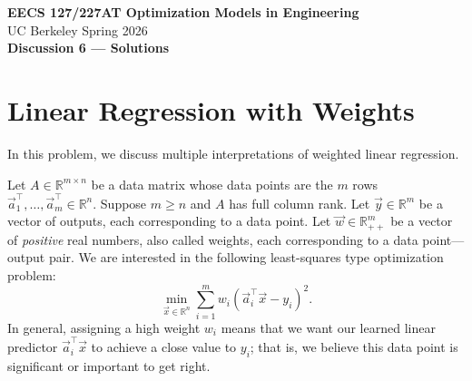 \documentclass[10pt]{article}
\newcommand{\RR}{\mathbb{R}}
\begin{document}
\begin{center}
    {\Large\bfseries EECS 127/227AT \quad Optimization Models in Engineering}\\[0.5em]
    {\large UC Berkeley \hfill Spring 2026}\\[1em]
    {\LARGE\bfseries Discussion 6 --- Solutions}
\end{center}

\section{Linear Regression with Weights}

In this problem, we discuss multiple interpretations of weighted linear regression.

Let $A \in \RR^{m \times n}$ be a data matrix whose data points are the $m$ rows $\vec{a}_1^\top, \ldots, \vec{a}_m^\top \in \RR^n$. Suppose $m \geq n$ and $A$ has full column rank. Let $\vec{y} \in \RR^m$ be a vector of outputs, each corresponding to a data point. Let $\vec{w} \in \RR^m_{++}$ be a vector of \emph{positive} real numbers, also called weights, each corresponding to a data point---output pair. We are interested in the following least-squares type optimization problem:
\begin{equation}
    \min_{\vec{x} \in \RR^n} \sum_{i=1}^{m} w_i (\vec{a}_i^\top \vec{x} - y_i)^2.
\end{equation}
In general, assigning a high weight $w_i$ means that we want our learned linear predictor $\vec{a}_i^\top \vec{x}$ to achieve a close value to $y_i$; that is, we believe this data point is significant or important to get right.
\end{document}

